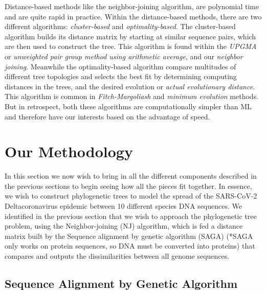 Distance-based methods like the neighbor-joining algorithm, are polynomial time and are quite rapid in practice. Within the distance-based methods, there are two different algorithms: \emph{cluster-based} and \emph{optimality-based}. The cluster-based algorithm builds its distance matrix by starting at similar sequence pairs, which are then used to construct the tree. This algorithm is found within the \emph{UPGMA} or \emph{unweighted pair group method using arithmetic average}, and our \emph{neighbor joining}. Meanwhile the optimality-based algorithm compare multitudes of different tree topologies and selects the best fit by determining computing distances in the trees, and the desired evolution or \emph{actual evolutionary distance}. This algorithm is common in \emph{Fitch-Margoliash} and \emph{minimum evolution} methods. But in retrospect, both these algorithms are computationally simpler than ML and therefore have our interests based on the advantage of speed.  

\section{Our Methodology}

In this section we now wish to bring in all the different components described in the previous sections to begin seeing how all the pieces fit together. In essence, we wish to construct phylogenetic trees to model the spread of the SARS-CoV-2 Deltacoronavirus epidemic between 10 different species DNA sequences. We identified in the previous section that we wish to approach the phylogenetic tree problem, using the Neighbor-joining (NJ) algorithm, which is fed a distance matrix built by the Sequence alignment by genetic algorithm (SAGA) (*SAGA only works on protein sequences, so DNA must be converted into proteins) that compares and outputs the dissimilarities between all genome sequences.  

\subsection{Sequence Alignment by Genetic Algorithm}


